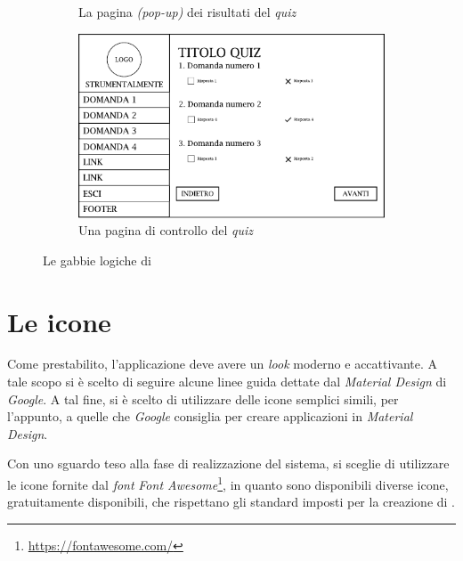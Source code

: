 \begin{figure}[H]
\begin{subfigure}[t]{0.5\textwidth}
		\caption{La pagina \emph{(pop-up)} dei risultati del \emph{quiz}}
	\end{subfigure}
	\begin{subfigure}[t]{0.5\textwidth}
		\centering
		\includegraphics[width=\textwidth]{gabbie_logiche/Controlla_Quiz}
		\caption{Una pagina di controllo del \emph{quiz}}
	\end{subfigure}
	\label{fig:gabbie-logiche}
	\caption{Le gabbie logiche di \ProjectTitle{}}
\end{figure}

\section{Le icone}

Come prestabilito, l'applicazione deve avere un \emph{look} moderno e accattivante. A tale scopo si è scelto di seguire alcune linee guida dettate dal \emph{Material Design} di \emph{Google}. A tal fine, si è scelto di utilizzare delle icone semplici simili, per l'appunto, a quelle che \emph{Google} consiglia per creare applicazioni in \emph{Material Design}. 

Con uno sguardo teso alla fase di realizzazione del sistema, si sceglie di utilizzare le icone fornite dal \emph{font} \emph{Font Awesome}\footnote{\url{https://fontawesome.com/}}, in quanto sono disponibili diverse icone, gratuitamente disponibili, che rispettano gli standard imposti per la creazione di \ProjectTitle{}.